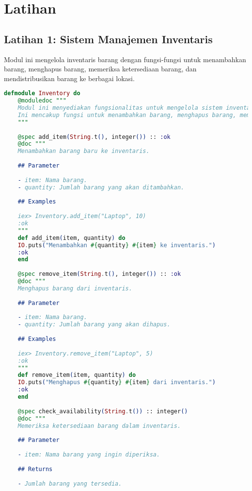 \section{Latihan}
\subsection{Latihan 1: Sistem Manajemen Inventaris}

Modul ini mengelola inventaris barang dengan fungsi-fungsi untuk menambahkan barang, menghapus barang, memeriksa ketersediaan barang, dan mendistribusikan barang ke berbagai lokasi.

\begin{lstlisting}[language=Elixir, caption={Modul Manajemen Inventaris}]
	defmodule Inventory do
	@moduledoc """
	Modul ini menyediakan fungsionalitas untuk mengelola sistem inventaris.
	Ini mencakup fungsi untuk menambahkan barang, menghapus barang, memeriksa ketersediaan barang, dan mendistribusikan barang ke lokasi yang berbeda.
	"""
	
	@spec add_item(String.t(), integer()) :: :ok
	@doc """
	Menambahkan barang baru ke inventaris.
	
	## Parameter
	
	- item: Nama barang.
	- quantity: Jumlah barang yang akan ditambahkan.
	
	## Examples
	
	iex> Inventory.add_item("Laptop", 10)
	:ok
	"""
	def add_item(item, quantity) do
	IO.puts("Menambahkan #{quantity} #{item} ke inventaris.")
	:ok
	end
	
	@spec remove_item(String.t(), integer()) :: :ok
	@doc """
	Menghapus barang dari inventaris.
	
	## Parameter
	
	- item: Nama barang.
	- quantity: Jumlah barang yang akan dihapus.
	
	## Examples
	
	iex> Inventory.remove_item("Laptop", 5)
	:ok
	"""
	def remove_item(item, quantity) do
	IO.puts("Menghapus #{quantity} #{item} dari inventaris.")
	:ok
	end
	
	@spec check_availability(String.t()) :: integer()
	@doc """
	Memeriksa ketersediaan barang dalam inventaris.
	
	## Parameter
	
	- item: Nama barang yang ingin diperiksa.
	
	## Returns
	
	- Jumlah barang yang tersedia.
	

\end{lstlisting}
